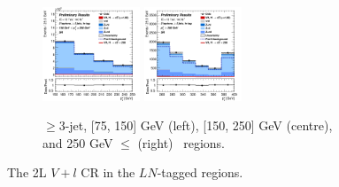 \begin{figure}[h!]
\begin{subfigure}[b]{\textwidth}
        \includegraphics[width=0.32\textwidth]{Images/VH/Own_fit/postfit_VHcc/Region_distpTV_BMax250_BMin150_DSR_J3_TTypeln_incJet1_T1_L2_Y6051_GlobalFit_conditionnal_mu1.png}
        \includegraphics[width=0.32\textwidth]{Images/VH/Own_fit/postfit_VHcc/Region_distpTV_BMin250_DSR_J3_TTypeln_incJet1_T1_L2_Y6051_GlobalFit_conditionnal_mu1.png}
        \caption{$\geq$3-jet, [75, 150] GeV (left), [150, 250] GeV (centre), and 250  GeV $\leq$ (right) \ptv\ regions.}
        \label{fig:plots_VHcc_2L_LN_3J}
    \end{subfigure}
    \caption{The 2L $V+l$ CR in the $LN$-tagged regions.}
    \label{fig:plots_VHcc_2L_LN}
\end{figure}

